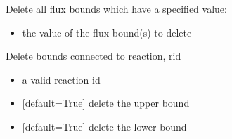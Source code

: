 \documentclass[letterpaper,10pt,english]{sphinxmanual}
\begin{document}
\begin{fulllineitems}
\begin{fulllineitems}
\begin{itemize}
\begin{description}
\end{description}

\end{itemize}

\end{fulllineitems}


\begin{fulllineitems}
\label{\detokenize{modules_doc:cbmpy.CBModel.Model.deleteAllFluxBoundsWithValue}}
\pysigstartsignatures
{}
\pysigstopsignatures
\sphinxAtStartPar
Delete all flux bounds which have a specified value:
\begin{itemize}
\item {} 
\sphinxAtStartPar
{} the value of the flux bound(s) to delete

\end{itemize}

\end{fulllineitems}


\begin{fulllineitems}
\label{\detokenize{modules_doc:cbmpy.CBModel.Model.deleteBoundsForReactionId}}
\pysigstartsignatures
{}
\pysigstopsignatures
\sphinxAtStartPar
Delete bounds connected to reaction, rid
\begin{itemize}
\item {} 
\sphinxAtStartPar
{} a valid reaction id

\item {} 
\sphinxAtStartPar
{} {[}default=True{]} delete the upper bound

\item {} 
\sphinxAtStartPar
{} {[}default=True{]} delete the lower bound

\end{itemize}


\end{fulllineitems}
\end{fulllineitems}
\end{document}

